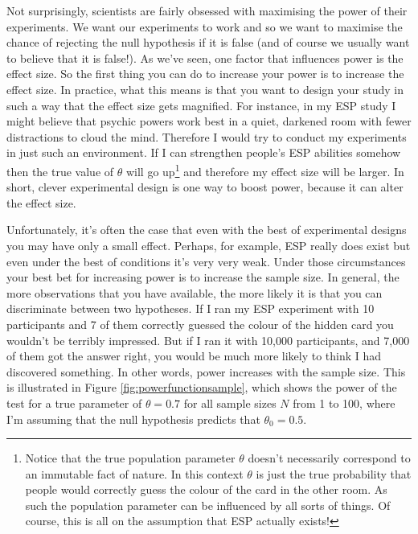 \documentclass[
]{book}
\begin{document}
Not surprisingly, scientists are fairly obsessed with maximising the power of their experiments. We want our experiments to work and so we want to maximise the chance of rejecting the null hypothesis if it is false (and of course we usually want to believe that it is false!). As we've seen, one factor that influences power is the effect size. So the first thing you can do to increase your power is to increase the effect size. In practice, what this means is that you want to design your study in such a way that the effect size gets magnified. For instance, in my ESP study I might believe that psychic powers work best in a quiet, darkened room with fewer distractions to cloud the mind. Therefore I would try to conduct my experiments in just such an environment. If I can strengthen people's ESP abilities somehow then the true value of \(\theta\) will go up\footnote{Notice that the true population parameter \(\theta\) doesn't necessarily correspond to an immutable fact of nature. In this context \(\theta\) is just the true probability that people would correctly guess the colour of the card in the other room. As such the population parameter can be influenced by all sorts of things. Of course, this is all on the assumption that ESP actually exists!} and therefore my effect size will be larger. In short, clever experimental design is one way to boost power, because it can alter the effect size.

Unfortunately, it's often the case that even with the best of experimental designs you may have only a small effect. Perhaps, for example, ESP really does exist but even under the best of conditions it's very very weak. Under those circumstances your best bet for increasing power is to increase the sample size. In general, the more observations that you have available, the more likely it is that you can discriminate between two hypotheses. If I ran my ESP experiment with 10 participants and 7 of them correctly guessed the colour of the hidden card you wouldn't be terribly impressed. But if I ran it with 10,000 participants, and 7,000 of them got the answer right, you would be much more likely to think I had discovered something. In other words, power increases with the sample size. This is illustrated in Figure \ref{fig:powerfunctionsample}, which shows the power of the test for a true parameter of \(\theta = 0.7\) for all sample sizes \(N\) from 1 to 100, where I'm assuming that the null hypothesis predicts that \(\theta_0 = 0.5\).
\end{document}
